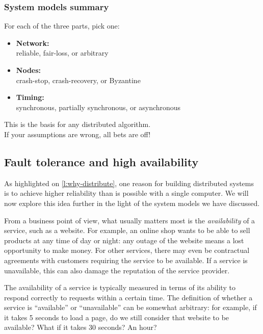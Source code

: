 \begin{frame}
    \label{s:model-summary}
    \frametitle{System models summary}
    For each of the three parts, pick one:\\
    \begin{itemize}
        \item \textbf{Network:}\\
            reliable, fair-loss, or arbitrary\\[1em]
        \item \textbf{Nodes:}\\
            crash-stop, crash-recovery, or Byzantine\\[1em]
        \item \textbf{Timing:}\\
            synchronous, partially synchronous, or asynchronous\\[1em]
    \end{itemize}
    This is the basis for any distributed algorithm.\\
    If your assumptions are wrong, all bets are off!
\end{frame}
\label{l:model-summary}

\subsection{Fault tolerance and high availability}\label{sec:fault-tolerance}

As highlighted on \autoref{l:why-distribute}, one reason for building distributed systems is to achieve higher reliability than is possible with a single computer.
We will now explore this idea further in the light of the system models we have discussed.

From a business point of view, what usually matters most is the \emph{availability} of a service, such as a website.
For example, an online shop wants to be able to sell products at any time of day or night: any outage of the website means a lost opportunity to make money.
For other services, there may even be contractual agreements with customers requiring the service to be available.
If a service is unavailable, this can also damage the reputation of the service provider.

The availability of a service is typically measured in terms of its ability to respond correctly to requests within a certain time.
The definition of whether a service is ``available'' or ``unavailable'' can be somewhat arbitrary: for example, if it takes 5 seconds to load a page, do we still consider that website to be available?
What if it takes 30 seconds?
An hour?

